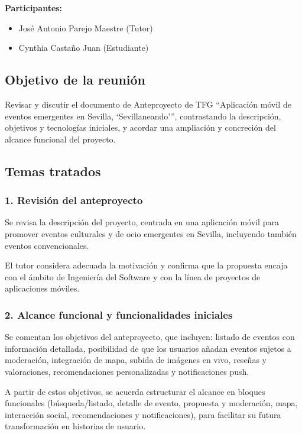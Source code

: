 \textbf{Participantes:}
\begin{itemize}
    \item José Antonio Parejo Maestre (Tutor)
    \item Cynthia Castaño Juan (Estudiante)
\end{itemize}

\subsection*{Objetivo de la reunión}
Revisar y discutir el documento de Anteproyecto de TFG ``Aplicación móvil de eventos emergentes en Sevilla, `Sevillaneando''', contrastando la descripción, objetivos y tecnologías iniciales, y acordar una ampliación y concreción del alcance funcional del proyecto.

\subsection*{Temas tratados}

\subsubsection*{1. Revisión del anteproyecto}
Se revisa la descripción del proyecto, centrada en una aplicación móvil para promover eventos culturales y de ocio emergentes en Sevilla, incluyendo también eventos convencionales.

El tutor considera adecuada la motivación y confirma que la propuesta encaja con el ámbito de Ingeniería del Software y con la línea de proyectos de aplicaciones móviles.

\subsubsection*{2. Alcance funcional y funcionalidades iniciales}
Se comentan los objetivos del anteproyecto, que incluyen: listado de eventos con información detallada, posibilidad de que los usuarios añadan eventos sujetos a moderación, integración de mapa, subida de imágenes en vivo, reseñas y valoraciones, recomendaciones personalizadas y notificaciones push.

A partir de estos objetivos, se acuerda estructurar el alcance en bloques funcionales (búsqueda/listado, detalle de evento, propuesta y moderación, mapa, interacción social, recomendaciones y notificaciones), para facilitar su futura transformación en historias de usuario.

